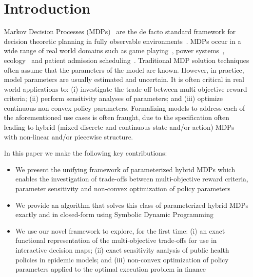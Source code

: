 \section{Introduction}
\label{sec:introduction}

Markov Decision Processes (MDPs)~\parencite{Howard_MIT_1960} are the de facto standard framework for decision theoretic
planning in fully observable environments~\parencite{Boutilier_JAIR_1999}. MDPs occur in a wide range of real world domains such as game playing~\parencite{Szita_RL_2012}, power systems~\parencite{Reddy_IJCAI_2011}, ecology~\parencite{Williams_EM_2009} and patient admission scheduling~\parencite{Zhu_AIM_2014}. Traditional MDP solution techniques often assume that the parameters of the model are known. However, in practice, model parameters are usually estimated and uncertain. It is often critical in real world applications to: (i) investigate the trade-off between multi-objective reward criteria; (ii) perform sensitivity analyses of parameters; and (iii) optimize continuous non-convex policy parameters. Formalizing models to address each of the aforementioned use cases is often fraught, due to the specification often leading to hybrid (mixed discrete and continuous state and/or action) MDPs with non-linear and/or piecewise structure. 

In this paper we make the following key contributions:
\begin{itemize}
    \item We present the unifying framework of parameterized hybrid MDPs which enables the investigation of trade-offs between multi-objective reward criteria, parameter sensitivity and non-convex optimization of policy parameters
    \item We provide an algorithm that solves this class of parameterized hybrid MDPs exactly and in closed-form using Symbolic Dynamic Programming~\parencite{Boutilier_IJCAI_2001}
    \item We use our novel framework to explore, for the first time: (i) an exact functional representation of the multi-objective trade-offs for use in interactive decision maps; (ii) exact sensitivity analysis of public health policies in epidemic models; and (iii) non-convex optimization of policy parameters applied to the optimal execution problem in finance
\end{itemize}

